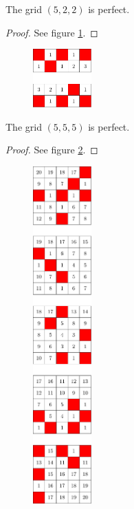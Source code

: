 \begin{con}
The grid $(5,2,2)$ is perfect.
\end{con}

\begin{proof}
See figure \ref{fig:2x5x2_numbered_heatmap}.
\end{proof}

\begin{figure}[]
\centering
\includegraphics[width=0.2\textwidth]{figures/7/2x5x2_numbered_heatmap.pdf}
\caption{}
\label{fig:2x5x2_numbered_heatmap}
\end{figure} 

\begin{con}
The grid $(5,5,5)$ is perfect.
\end{con}

\begin{proof}
See figure \ref{fig:5x5x5_numbered_heatmap}.
\end{proof}

\begin{figure}[]
\centering
\includegraphics[width=0.2\textwidth]{figures/7/5x5x5_numbered_heatmap.pdf}
\caption{}
\label{fig:5x5x5_numbered_heatmap}
\end{figure}

